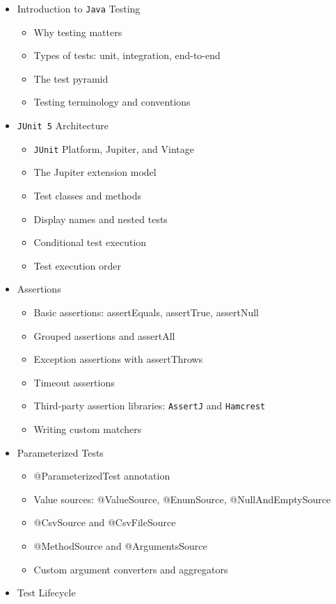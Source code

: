 \documentclass[
]{article}
\providecommand{\tightlist}{%
  \setlength{\itemsep}{0pt}\setlength{\parskip}{0pt}}
\begin{document}
\begin{itemize}
\tightlist
\item
  Introduction to \texttt{Java} Testing

  \begin{itemize}
  \tightlist
  \item
    Why testing matters
  \item
    Types of tests: unit, integration, end-to-end
  \item
    The test pyramid
  \item
    Testing terminology and conventions
  \end{itemize}
\item
  \texttt{JUnit\ 5} Architecture

  \begin{itemize}
  \tightlist
  \item
    \texttt{JUnit} Platform, Jupiter, and Vintage
  \item
    The Jupiter extension model
  \item
    Test classes and methods
  \item
    Display names and nested tests
  \item
    Conditional test execution
  \item
    Test execution order
  \end{itemize}
\item
  Assertions

  \begin{itemize}
  \tightlist
  \item
    Basic assertions: assertEquals, assertTrue, assertNull
  \item
    Grouped assertions and assertAll
  \item
    Exception assertions with assertThrows
  \item
    Timeout assertions
  \item
    Third-party assertion libraries: \texttt{AssertJ} and
    \texttt{Hamcrest}
  \item
    Writing custom matchers
  \end{itemize}
\item
  Parameterized Tests

  \begin{itemize}
  \tightlist
  \item
    @ParameterizedTest annotation
  \item
    Value sources: @ValueSource, @EnumSource, @NullAndEmptySource
  \item
    @CsvSource and @CsvFileSource
  \item
    @MethodSource and @ArgumentsSource
  \item
    Custom argument converters and aggregators
  \end{itemize}
\item
  Test Lifecycle


\end{itemize}
\end{document}

